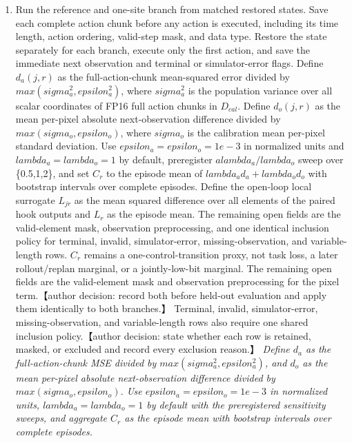 \documentclass[10pt,a4paper]{article}
\begin{document}
\begin{enumerate}[leftmargin=*,start=2]
  \item Run the reference and one-site branch from matched restored states. Save each complete action chunk before any action is executed, including its time length, action ordering, valid-step mask, and data type. Restore the state separately for each branch, execute only the first action, and save the immediate next observation and terminal or simulator-error flags. Define \(d_{a}(j,r)\) as the full-action-chunk mean-squared error divided by \(max(sigma_{a}^{2}, epsilon_{a}^{2})\), where \(sigma_{a}^{2}\) is the population variance over all scalar coordinates of FP16 full action chunks in \(D_{cal}\). Define \(d_{o}(j,r)\) as the mean per-pixel absolute next-observation difference divided by \(max(sigma_{o}, epsilon_{o})\), where \(sigma_{o}\) is the calibration mean per-pixel standard deviation. Use \(epsilon_{a}=epsilon_{o}=1e-3\) in normalized units and \(lambda_{a}=lambda_{o}=1\) by default, preregister \(a lambda_{a}/lambda_{o}\) sweep over \{0.5,1,2\}, and set \(C_{r}\) to the episode mean of \(lambda_{a} d_{a}+lambda_{o} d_{o}\) with bootstrap intervals over complete episodes. Define the open-loop local surrogate \(L_{jr}\) as the mean squared difference over all elements of the paired hook outputs and \(L_{r}\) as the episode mean. The remaining open fields are the valid-element mask, observation preprocessing, and one identical inclusion policy for terminal, invalid, simulator-error, missing-observation, and variable-length rows. \(C_{r}\) remains a one-control-transition proxy, not task loss, a later rollout/replan marginal, or a jointly-low-bit marginal. The remaining open fields are the valid-element mask and observation preprocessing for the pixel term.【author decision: record both before held-out evaluation and apply them identically to both branches.】 Terminal, invalid, simulator-error, missing-observation, and variable-length rows also require one shared inclusion policy.【author decision: state whether each row is retained, masked, or excluded and record every exclusion reason.】
\noindent\emph{Define \(d_{a}\) as the full-action-chunk MSE divided by \(max(sigma_{a}^{2}, epsilon_{a}^{2})\), and \(d_{o}\) as the mean per-pixel absolute next-observation difference divided by \(max(sigma_{o}, epsilon_{o})\). Use \(epsilon_{a}=epsilon_{o}=1e-3\) in normalized units, \(lambda_{a}=lambda_{o}=1\) by default with the preregistered sensitivity sweeps, and aggregate \(C_{r}\) as the episode mean with bootstrap intervals over complete episodes.}

\end{enumerate}
\end{document}
